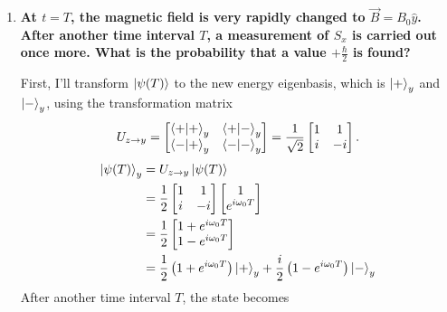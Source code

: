 \documentclass[11pt]{article}
\begin{document}
\begin{enumerate}[label=\textbf{\arabic*.}]
{\begin{enumerate}[label=\textbf{(\alph*)}]
{\begin{align*}
                    \end{align*}
                    We can ignore the overall phase factor, so
                    \begin{equation*}
                        \ket{\psi(T)}=\frac{1}{\sqrt 2}\left(\ket{+}+e^{i\omega_0T}\ket{-}\right)
                    \end{equation*}
                }
                \item{
                    \textbf{\boldmath At \(t=T\), the magnetic field is very rapidly changed to \(\vec{B}=B_0\hat{y}\). After another time interval \(T\), a measurement of \(S_x\) is carried out once more. What is the probability that a value \(+\frac \hbar 2\) is found?}
                    \par
                    First, I'll transform \(\ket{\psi(T)}\) to the new energy eigenbasis, which is \(\ket{+}_y\) and \(\ket{-}_y\), using the transformation matrix
                    \[U_{z\rightarrow y}=\begin{bmatrix}\braket{+|+}_y & \braket{+|-}_y \\ \braket{-|+}_y & \braket{-|-}_y\end{bmatrix}=\frac{1}{\sqrt 2}\begin{bmatrix}1 & 1 \\ i & -i\end{bmatrix}.\]
                    \begin{align*}
                        \ket{\psi(T)}_y&=U_{z\rightarrow y}\ket{\psi(T)} \\
                        &=\frac 1 2\begin{bmatrix}1 & 1 \\ i & -i\end{bmatrix}\begin{bmatrix}1 \\ e^{i\omega_0T}\end{bmatrix} \\
                        &=\frac 1 2\begin{bmatrix}1+e^{i\omega_0T} \\ 1-e^{i\omega_0T}\end{bmatrix} \\
                        &=\frac 1 2\left(1+e^{i\omega_0T}\right)\ket{+}_y+\frac i 2\left(1-e^{i\omega_0T}\right)\ket{-}_y
                    \end{align*}
                    After another time interval \(T\), the state becomes
                    \begin{align*}

\end{align*}}
\end{enumerate}}
\end{enumerate}
\end{document}
